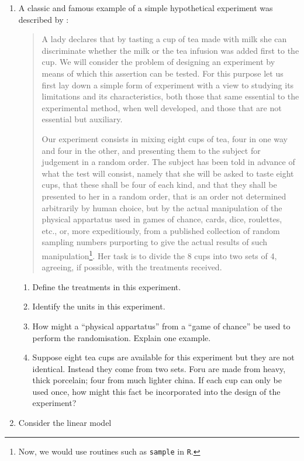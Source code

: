 \documentclass[
]{book}
\providecommand{\tightlist}{%
  \setlength{\itemsep}{0pt}\setlength{\parskip}{0pt}}
\theoremstyle{definition}
\theoremstyle{definition}
\theoremstyle{definition}
\theoremstyle{definition}
\theoremstyle{remark}
\begin{document}
\begin{enumerate}
\def\labelenumi{\arabic{enumi}.}
\item
  \citep[Adapted from][]{Morris2011} A classic and famous example of a simple hypothetical experiment was described by \citet{Fisher1935}:

  \begin{quote}
  A lady declares that by tasting a cup of tea made with milk she can discriminate whether the milk or the tea infusion was added first to the cup. We will consider the problem of designing an experiment by means of which this assertion can be tested. For this purpose let us first lay down a simple form of experiment with a view to studying its limitations and its characteristics, both those that same essential to the experimental method, when well developed, and those that are not essential but auxiliary.

  Our experiment consists in mixing eight cups of tea, four in one way and four in the other, and presenting them to the subject for judgement in a random order. The subject has been told in advance of what the test will consist, namely that she will be asked to taste eight cups, that these shall be four of each kind, and that they shall be presented to her in a random order, that is an order not determined arbitrarily by human choice, but by the actual manipulation of the physical appartatus used in games of chance, cards, dice, roulettes, etc., or, more expeditiously, from a published collection of random sampling numbers purporting to give the actual results of such manipulation\footnote{Now, we would use routines such as \texttt{sample} in \texttt{R}.}. Her task is to divide the 8 cups into two sets of 4, agreeing, if possible, with the treatments received.
  \end{quote}

  \begin{enumerate}
  \def\labelenumii{\alph{enumii}.}
  \tightlist
  \item
    Define the treatments in this experiment.
  \item
    Identify the units in this experiment.
  \item
    How might a ``physical appartatus'' from a ``game of chance'' be used to perform the randomisation. Explain one example.
  \item
    Suppose eight tea cups are available for this experiment but they are not identical. Instead they come from two sets. Foru are made from heavy, thick porcelain; four from much lighter china. If each cup can only be used once, how might this fact be incorporated into the design of the experiment?
  \end{enumerate}
\item
  Consider the linear model


\end{enumerate}
\end{document}
